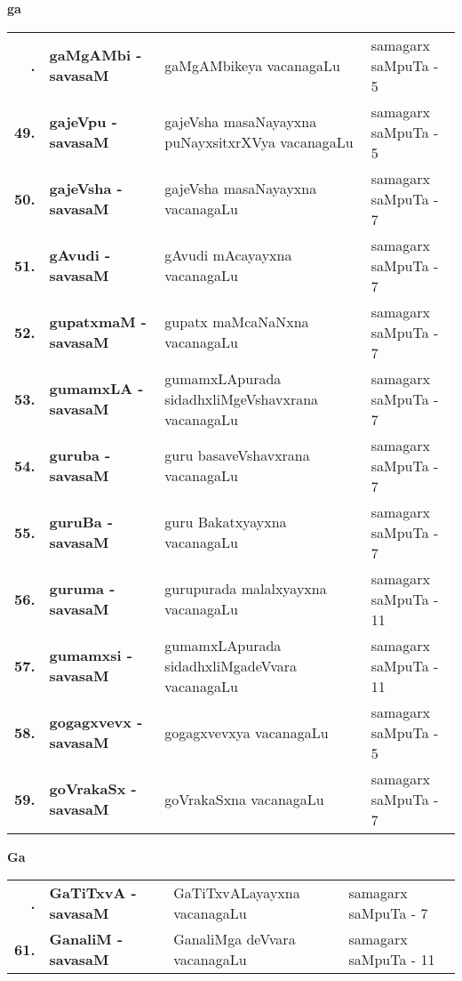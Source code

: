 \centerline{\bf ga}
\medskip

{\renewcommand{\arraystretch}{1.35}
\begin{longtable}{>{\bf}r>{\bf}l>{\raggedright}p{8cm}l}
\endfirsthead
\endhead
\endfoot
\endlastfoot
48. &  gaMgAMbi - savasaM & gaMgAMbikeya vacanagaLu & samagarx saMpuTa - 5\\
49. &  gajeVpu - savasaM & gajeVsha masaNayayxna puNayxsitxrXVya vacanagaLu & samagarx saMpuTa - 5 \\
50. &  gajeVsha - savasaM & gajeVsha masaNayayxna vacanagaLu & samagarx saMpuTa - 7 \\
51. &  gAvudi - savasaM &  gAvudi mAcayayxna vacanagaLu & samagarx saMpuTa - 7 \\
52. &  gupatxmaM - savasaM & gupatx maMcaNaNxna vacanagaLu & samagarx saMpuTa - 7 \\
53. &  gumamxLA - savasaM & gumamxLApurada sidadhxliMgeVshavxrana vacanagaLu & samagarx saMpuTa - 7 \\
54. &  guruba - savasaM & guru basaveVshavxrana vacanagaLu & samagarx saMpuTa - 7 \\
55. &  guruBa - savasaM & guru Bakatxyayxna vacanagaLu & samagarx saMpuTa - 7 \\
56. &  guruma - savasaM & gurupurada malalxyayxna vacanagaLu & samagarx saMpuTa - 11 \\
57. &  gumamxsi - savasaM & gumamxLApurada sidadhxliMgadeVvara vacanagaLu & samagarx saMpuTa - 11 \\
58. & gogagxvevx  - savasaM & gogagxvevxya vacanagaLu & samagarx saMpuTa - 5 \\
59. &  goVrakaSx - savasaM & goVrakaSxna vacanagaLu & samagarx saMpuTa - 7
\end{longtable}}

\medskip

\centerline{\bf Ga}

{\renewcommand{\arraystretch}{1.32}
\begin{longtable}{>{\bf}r>{\bf}l>{\raggedright}p{8cm}l}
\endfirsthead
\endhead
\endfoot
\endlastfoot
60. &  GaTiTxvA - savasaM & GaTiTxvALayayxna vacanagaLu & samagarx saMpuTa - 7\\
61. &  GanaliM - savasaM & GanaliMga deVvara vacanagaLu & samagarx saMpuTa - 11
\end{longtable}}

